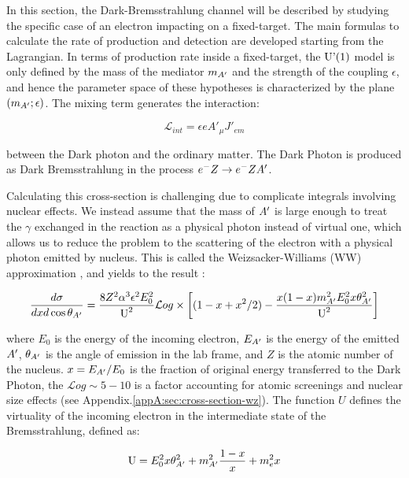 In this section, the Dark-Bremsstrahlung channel will be described by studying the specific case of an electron impacting on a fixed-target. The main formulas to calculate the rate of production and detection are developed starting from the Lagrangian. In terms of production rate inside a fixed-target, the $\textrm{U'(1)}$ model is only defined by the mass of the mediator $m_{A'}$ and the strength of the coupling $\epsilon$, and hence the parameter space of these hypotheses is characterized by the plane $(m_{A'};\epsilon)$. The mixing term generates the interaction:

\begin{equation}
  \label{eq:dm-interaction}
  \mathcal{L}_{int} = \epsilon e A'_{\mu}J'_{em}
\end{equation}

between the Dark photon and the ordinary matter. The Dark Photon is produced as Dark Bremsstrahlung in the process $e^- Z \to e^- Z A'$.

Calculating this cross-section is challenging due to complicate integrals involving nuclear effects. We instead assume that the mass of $A'$ is large enough to treat the $\gamma$ exchanged in the reaction as a physical photon instead of virtual one, which allows us to reduce the problem to the scattering of the electron with a physical photon emitted by nucleus. This is called the Weizsacker-Williams (WW) approximation \cite{Kim:1973he}, and yields to the result \cite{jdb}:

\begin{equation}
  \label{eq:dm-diff-cross}
  \frac{d\sigma}{dxd\cos{\theta_{A'}}} = \frac{8 Z^2 \alpha^3 \epsilon^2 E^2_0}{\textrm{U}^2} \mathcal{L}og \times \left[ (1 - x + x^2/2) - \frac{x(1-x)m^2_{A'}E^2_0 x \theta^2_{A'}}{\textrm{U}^2} \right]
\end{equation}

where $E_0$ is the energy of the incoming electron, $E_{A'}$ is the energy of the emitted $A'$, $\theta_{A'}$ is the angle of emission in the lab frame, and $Z$ is the atomic number of the nucleus. $x=E_{A'}/E_0$ is the fraction of original energy transferred to the Dark Photon, the $\mathcal{L}og \sim 5 - 10$ is a factor accounting for atomic screenings and nuclear size effects (see Appendix.\ref{appA:sec:cross-section-wz}). The function $U$ defines the virtuality of the incoming electron in the intermediate state of the Bremsstrahlung, defined as:

\begin{equation}
  \label{eq:u-func}
  \textrm{U} = E^2_0 x \theta^2_{A'} + m^2_{A'} \frac{1 - x}{x} + m^2_e x
\end{equation}


